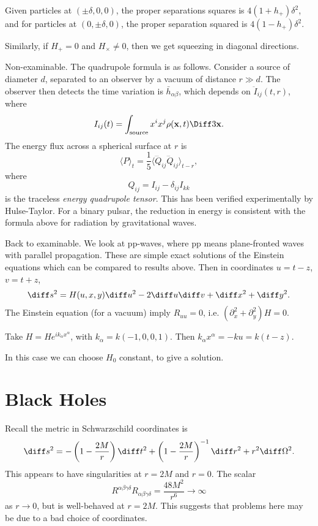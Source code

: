 \documentclass[12pt]{article}
\begin{document}
\begin{exbox}
	Given particles at $(\pm \delta, 0, 0)$, the proper separations squares is $4(1 + h_+) \delta^2$, and for particles at $(0, \pm \delta, 0)$, the proper separation squared is $4 (1 - h_+) \delta^2$.

	Similarly, if $H_+ = 0$ and $H_\times \neq 0$, then we get squeezing in diagonal directions.
\end{exbox}

Non-examinable. The quadrupole formula is as follows. Consider a source of diameter $d$, separated to an observer by a vacuum of distance $r \gg d$. The observer then detects the time variation is $\bar h_{\alpha\beta}$, which depends on $\ddot I_{ij}(t, r)$, where
\[
I_{ij}(t) = \int_{\mathrm{source}} x^i x^j \rho(\mathbf{x}, t) \Diff3 \mathbf{x}.
\]
The energy flux across a spherical surface at $r$ is
\[
\langle P \rangle_t = \frac{1}{5} \langle \dddot Q_{ij} \dddot Q_{ij} \rangle_{t-r},
\]
where
\[
	Q_{ij} = I_{ij} - \delta_{ij} I_{kk}
\]
is the traceless \emph{energy quadrupole tensor}. This has been verified experimentally by Hulse-Taylor. For a binary pulsar, the reduction in energy is consistent with the formula above for radiation by gravitational waves.

Back to examinable. We look at pp-waves, where pp means plane-fronted waves with parallel propagation. These are simple exact solutions of the Einstein equations which can be compared to results above. Then in coordinates $u = t - z$, $v = t + z$,
\[
\diff s^2 = H(u, x, y) \diff u^2 - 2 \diff u \diff v + \diff x^2 + \diff y^2.
\]
The Einstein equation (for a vacuum) imply $R_{uu} = 0$, i.e. $(\partial_x^2 + \partial_y^2) H = 0$.

\begin{exbox}
	Take $H = He^{i k_\alpha x^\alpha}$, with $k_\alpha = k(-1, 0, 0, 1)$. Then $k_\alpha x^\alpha = -k u = k(t - z)$.

	In this case we can choose $H_0$ constant, to give a solution.
\end{exbox}

\newpage

\section{Black Holes}
\label{sec:bh}

Recall the metric in Schwarzschild coordinates is
\[
\diff s^2 = - \left(1 - \frac{2M}{r} \right) \diff t^2 + \left(1 - \frac{2M}{r} \right)^{-1} \diff r^2 + r^2 \diff \Omega^2.
\]
This appears to have singularities at $r = 2M$ and $r = 0$. The scalar
\[
	R^{\alpha\beta\gamma\delta} R_{\alpha\beta\gamma\delta} = \frac{48 M^2}{r^6} \to \infty
\]
as $r \to 0$, but is well-behaved at $r = 2M$. This suggests that problems here may be due to a bad choice of coordinates.
\end{document}
